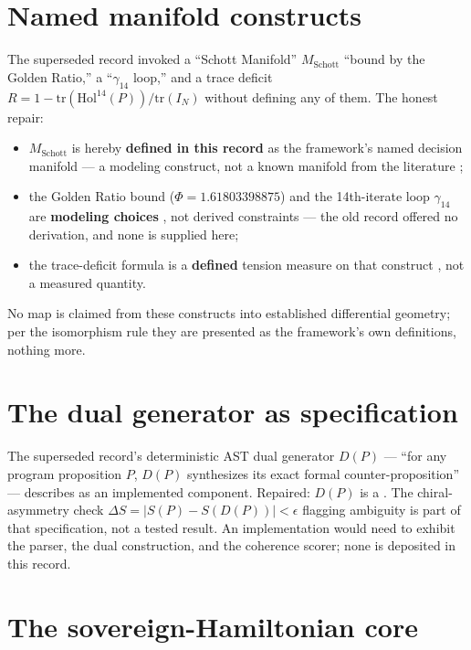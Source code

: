 \documentclass{alienfolio}
\begin{document}
\section{Named manifold constructs}
\label{sec:constructs}

The superseded record invoked a ``Schott Manifold'' $M_{\mathrm{Schott}}$
``bound by the Golden Ratio,'' a ``$\gamma_{14}$ loop,'' and a trace
deficit $R = 1 - \mathrm{tr}(\mathrm{Hol}^{14}(P))/\mathrm{tr}(I_N)$
without defining any of them. The honest repair:
\begin{itemize}
\item $M_{\mathrm{Schott}}$ is hereby \textbf{defined in this record}
as the framework's named decision manifold --- a modeling construct,
not a known manifold from the literature ;
\item the Golden Ratio bound ($\Phi = 1.61803398875$) and the
14th-iterate loop $\gamma_{14}$ are \textbf{modeling choices}
, not derived constraints --- the old record
offered no derivation, and none is supplied here;
\item the trace-deficit formula is a \textbf{defined} tension measure
on that construct , not a measured quantity.
\end{itemize}
No map is claimed from these constructs into established differential
geometry; per the isomorphism rule they are presented as the
framework's own definitions, nothing more.

\section{The dual generator as specification}
\label{sec:dual}

The superseded record's deterministic AST dual generator $D(P)$ ---
``for any program proposition $P$, $D(P)$ synthesizes its exact
formal counter-proposition'' --- describes  as an implemented component. Repaired: $D(P)$ is a
 . The chiral-asymmetry check
$\Delta S = |S(P) - S(D(P))| < \epsilon$ flagging ambiguity is part
of that specification, not a tested result. An implementation would
need to exhibit the parser, the dual construction, and the coherence
scorer; none is deposited in this record.

\section{The sovereign-Hamiltonian core}
\label{sec:hamiltonian}
\end{document}
